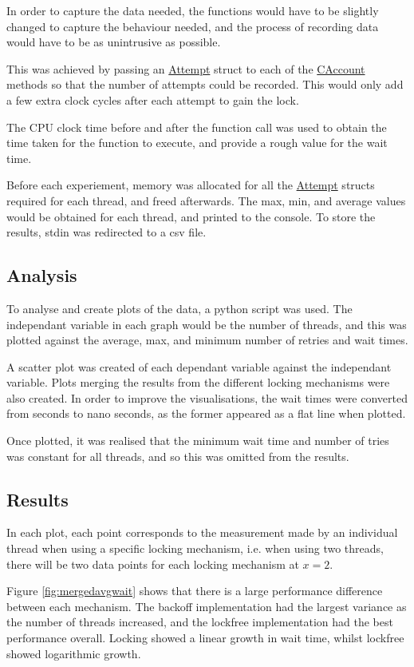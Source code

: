 \documentclass[12pt]{article}
\begin{document}
In order to capture the data needed, the functions would have to be slightly changed to capture the behaviour needed, and the process of recording data would have to be as unintrusive as possible. 

This was achieved by passing an \url{Attempt} struct to each of the \url{CAccount} methods so that the number of attempts could be recorded. This would only add a few extra clock cycles after each attempt to gain the lock.

The CPU clock time before and after the function call was used to obtain the time taken for the function to execute, and provide a rough value for the wait time.

Before each experiement, memory was allocated for all the \url{Attempt} structs required for each thread, and freed afterwards. The max, min, and average values would be obtained for each thread, and printed to the console. To store the results, stdin was redirected to a csv file.

\subsection{Analysis}

To analyse and create plots of the data, a python script was used. The independant variable in each graph would be the number of threads, and this was plotted against the average, max, and minimum number of retries and wait times.

A scatter plot was created of each dependant variable against the independant variable. Plots merging the results from the different locking mechanisms were also created. In order to improve the visualisations, the wait times were converted from seconds to nano seconds, as the former appeared as a flat line when plotted. 

Once plotted, it was realised that the minimum wait time and number of tries was constant for all threads, and so this was omitted from the results.

\subsection{Results}

In each plot, each point corresponds to the measurement made by an individual thread when using a specific locking mechanism, i.e. when using two threads, there will be two data points for each locking mechanism at $x = 2$.

Figure \ref{fig:mergedavgwait} shows that there is a large performance difference between each mechanism. The backoff implementation had the largest variance as the number of threads increased, and the lockfree implementation had the best performance overall. Locking showed a linear growth in wait time, whilst lockfree showed logarithmic growth.
\end{document}

